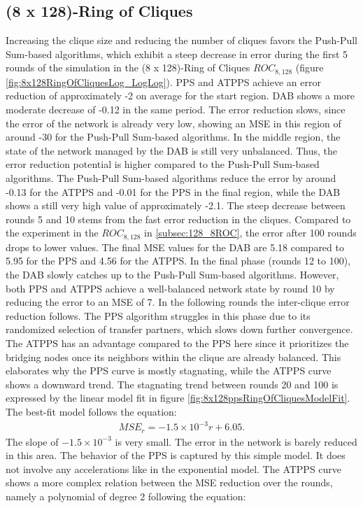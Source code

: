 \subsection{(8 x 128)-Ring of Cliques}\label{subsec:8_128ROC}
Increasing the clique size and reducing the number of cliques favors the Push-Pull Sum-based algorithms, which exhibit a steep decrease in error during the first 5 rounds of the simulation in the (8 x 128)-Ring of Cliques $ROC_{8,128}$ (figure \ref{fig:8x128RingOfCliquesLog_LogLog}). PPS and ATPPS achieve an error reduction of approximately -2 on average for the start region. DAB shows a more moderate decrease of -0.12 in the same period. The error reduction slows, since the error of the network is already very low, showing an MSE in this region of around -30 for the Push-Pull Sum-based algorithms. In the middle region, the state of the network managed by the DAB is still very unbalanced. Thus, the error reduction potential is higher compared to the Push-Pull Sum-based algorithms. The Push-Pull Sum-based algorithms reduce the error by around -0.13 for the ATPPS and -0.01 for the PPS in the final region, while the DAB shows a still very high value of approximately -2.1. The steep decrease between rounds 5 and 10 stems from the fast error reduction in the cliques. Compared to the experiment in the $ROC_{8, 128}$ in \ref{subsec:128_8ROC}, the error after 100 rounds drops to lower values. The final MSE values for the DAB are 5.18 compared to 5.95 for the PPS and 4.56 for the ATPPS. In the final phase (rounds 12 to 100), the DAB slowly catches up to the Push-Pull Sum-based algorithms. However, both PPS and ATPPS achieve a well-balanced network state by round 10 by reducing the error to an MSE of 7. In the following rounds the inter-clique error reduction follows. The PPS algorithm struggles in this phase due to its randomized selection of transfer partners, which slows down further convergence. The ATPPS has an advantage compared to the PPS here since it prioritizes the bridging nodes once its neighbors within the clique are already balanced. This elaborates why the PPS curve is mostly stagnating, while the ATPPS curve shows a downward trend. The stagnating trend between rounds 20 and 100 is expressed by the linear model fit in figure \ref{fig:8x128ppsRingOfCliquesModelFit}. The best-fit model follows the equation:
\begin{align}
    MSE_r=-1.5\times10^{-3}r+6.05. 
\end{align}
The slope of $-1.5\times10^{-3}$ is very small. The error in the network is barely reduced in this area. The behavior of the PPS is captured by this simple model. It does not involve any accelerations like in the exponential model. The ATPPS curve shows a more complex relation between the MSE reduction over the rounds, namely a polynomial of degree 2 following the equation:
